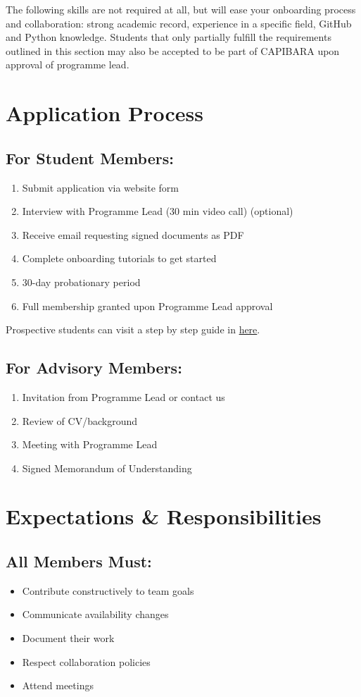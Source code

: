 \documentclass[11pt,a4paper]{article}
\begin{document}
The following skills are not required at all, but will ease your onboarding process and collaboration: strong academic record, experience in a specific field, GitHub and Python knowledge. Students that only partially fulfill the requirements outlined in this section may also be accepted to be part of CAPIBARA upon approval of programme lead.

\section{Application Process}

\subsection{For Student Members:}
\begin{enumerate}
\item Submit application via website form
\item Interview with Programme Lead (30 min video call) (optional)
\item Receive email requesting signed documents as PDF
\item Complete onboarding tutorials to get started
\item 30-day probationary period
\item Full membership granted upon Programme Lead approval
\end{enumerate}

Prospective students can visit a step by step guide in \href{../onboarding/00_applying_to_join.md}{here}.

\subsection{For Advisory Members:}
\begin{enumerate}
\item Invitation from Programme Lead or contact us
\item Review of CV/background
\item Meeting with Programme Lead
\item Signed Memorandum of Understanding
\end{enumerate}

\section{Expectations \& Responsibilities}

\subsection{All Members Must:}
\begin{itemize}
\item Contribute constructively to team goals
\item Communicate availability changes
\item Document their work
\item Respect collaboration policies
\item Attend meetings
\end{itemize}
\end{document}
